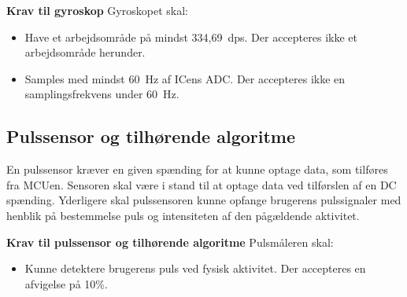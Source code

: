 \textbf{Krav til gyroskop} \newline
Gyroskopet skal:
\begin{itemize}
\item Have et arbejdsområde på mindst 334,69~dps. Der accepteres ikke et arbejdsområde herunder.
\item Samples med mindst 60~Hz af ICens ADC. Der accepteres ikke en samplingsfrekvens under 60~Hz.
\end{itemize}

\subsection{Pulssensor og tilhørende algoritme} \label{puls_krav}   
En pulssensor kræver en given spænding for at kunne optage data, som tilføres fra MCUen. Sensoren skal være i stand til at optage data ved tilførslen af en DC spænding. %
Yderligere skal pulssensoren kunne opfange brugerens pulssignaler med henblik på bestemmelse puls og intensiteten af den pågældende aktivitet.

\textbf{Krav til pulssensor og tilhørende algoritme} \newline
Pulsmåleren skal:
\begin{itemize}
\item Kunne detektere brugerens puls ved fysisk aktivitet. Der accepteres en afvigelse på 10\%.
\end{itemize}

